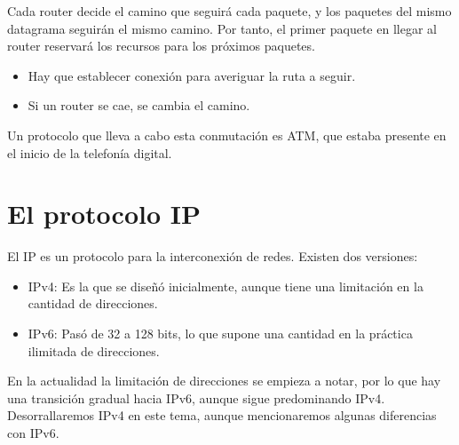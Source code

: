 Cada router decide el camino que seguirá cada paquete, y los paquetes del mismo datagrama seguirán el mismo camino. Por tanto, el primer paquete en llegar al router reservará los recursos para los próximos paquetes.

\begin{itemize}
    \item Hay que establecer conexión para averiguar la ruta a seguir. 
    \item Si un router se cae, se cambia el camino. 
\end{itemize}

Un protocolo que lleva a cabo esta conmutación es \acrfull{ATM}, que estaba presente en el inicio de la telefonía digital.


\section{El protocolo \acrshort{IP}}

El \acrfull{IP} es un protocolo para la interconexión de redes.
Existen dos versiones:
\begin{itemize}
    \item \acrshort{IPv4}: Es la que se diseñó inicialmente, aunque tiene una limitación en la cantidad de direcciones.
    \item \acrshort{IPv6}: Pasó de 32 a 128 bits, lo que supone una cantidad en la práctica ilimitada de direcciones.
\end{itemize}
En la actualidad la limitación de direcciones se empieza a notar, por lo que hay una transición gradual hacia \acrshort{IPv6}, aunque sigue predominando \acrshort{IPv4}. Desorrallaremos \acrshort{IPv4} en este tema, aunque mencionaremos algunas diferencias con \acrshort{IPv6}.

